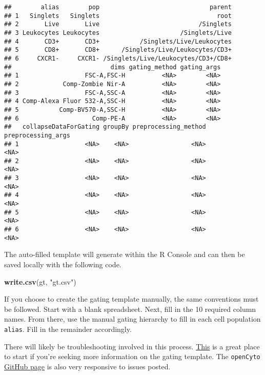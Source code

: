 \documentclass[]{book}
\newenvironment{Shaded}{\begin{snugshade}}{\end{snugshade}}
\newcommand{\KeywordTok}[1]{\textcolor[rgb]{0.13,0.29,0.53}{\textbf{#1}}}
\newcommand{\NormalTok}[1]{#1}
\newcommand{\StringTok}[1]{\textcolor[rgb]{0.31,0.60,0.02}{#1}}
\begin{document}
\begin{verbatim}
##        alias        pop                              parent
## 1   Singlets   Singlets                                root
## 2       Live       Live                           /Singlets
## 3 Leukocytes Leukocytes                      /Singlets/Live
## 4       CD3+       CD3+           /Singlets/Live/Leukocytes
## 5       CD8+       CD8+      /Singlets/Live/Leukocytes/CD3+
## 6     CXCR1-     CXCR1- /Singlets/Live/Leukocytes/CD3+/CD8+
##                           dims gating_method gating_args
## 1                  FSC-A,FSC-H          <NA>        <NA>
## 2            Comp-Zombie Nir-A          <NA>        <NA>
## 3                  FSC-A,SSC-A          <NA>        <NA>
## 4 Comp-Alexa Fluor 532-A,SSC-H          <NA>        <NA>
## 5           Comp-BV570-A,SSC-H          <NA>        <NA>
## 6                    Comp-PE-A          <NA>        <NA>
##   collapseDataForGating groupBy preprocessing_method preprocessing_args
## 1                  <NA>    <NA>                 <NA>               <NA>
## 2                  <NA>    <NA>                 <NA>               <NA>
## 3                  <NA>    <NA>                 <NA>               <NA>
## 4                  <NA>    <NA>                 <NA>               <NA>
## 5                  <NA>    <NA>                 <NA>               <NA>
## 6                  <NA>    <NA>                 <NA>               <NA>
\end{verbatim}

The auto-filled template will generate within the R Console and can then be saved locally with the following code.

\begin{Shaded}
\begin{Highlighting}[]
\KeywordTok{write.csv}\NormalTok{(gt, }\StringTok{"gt.csv"}\NormalTok{)}
\end{Highlighting}
\end{Shaded}

If you choose to create the gating template manually, the same conventions must be followed. Start with a blank spreadsheet. Next, fill in the 10 required column names. From there, use the manual gating hierarchy to fill in each cell population \texttt{alias}. Fill in the remainder accordingly.

There will likely be troubleshooting involved in this process. \href{https://www.bioconductor.org/packages/devel/bioc/vignettes/openCyto/inst/doc/HowToWriteCSVTemplate.html\#14_gating_method_that_generates_multiple_populations}{This} is a great place to start if you're seeking more information on the gating template. The \texttt{openCyto} \href{https://github.com/RGLab/openCyto}{GitHub page} is also very responsive to issues posted.
\end{document}
